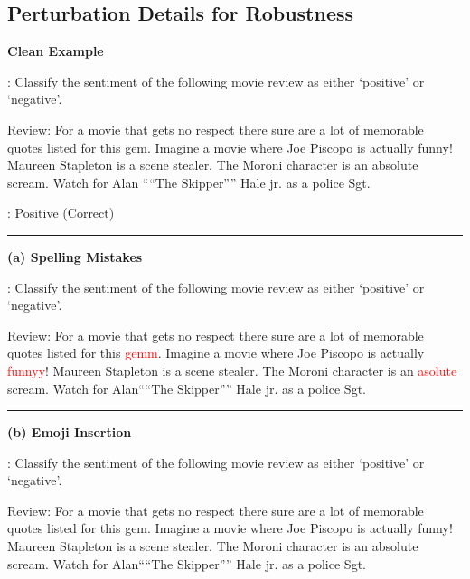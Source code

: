 \clearpage



\subsection{Perturbation Details for Robustness}

\begin{boxK}
\small
\textbf{Clean Example}

\user: Classify the sentiment of the following movie review as either `positive' or `negative'.

Review: For a movie that gets no respect there sure are a lot of memorable quotes listed for this gem. Imagine a movie where Joe Piscopo is actually funny! Maureen Stapleton is a scene stealer. The Moroni character is an absolute scream. Watch for Alan ````The Skipper'''' Hale jr. as a police Sgt.

\robot: Positive (\textcolor{green!50!black}{Correct})

\vspace{2pt}
\hrule
\vspace{2pt}

\textbf{(a) Spelling Mistakes}

\user: Classify the sentiment of the following movie review as either `positive' or `negative'.

Review: For a movie that gets no respect there sure are a lot of memorable quotes listed for this \textcolor{red}{gemm}. Imagine a movie where Joe Piscopo is actually \textcolor{red}{funnyy}! Maureen Stapleton is a scene stealer. The Moroni character is an \textcolor{red}{asolute} scream. Watch for Alan````The Skipper'''' Hale jr. as a police Sgt.


\vspace{2pt}
\hrule
\vspace{2pt}

\textbf{(b) Emoji Insertion}

\user: Classify the sentiment of the following movie review as either `positive' or `negative'.

Review: For a movie that gets no respect \emojilh \emojilh there sure are a lot of memorable quotes listed for this gem. Imagine a movie where Joe Piscopo is actually funny! \emojixkl \emojixkl \emojixkl Maureen Stapleton is a scene stealer. The Moroni character is an absolute scream. \emojidx \emojidx \emojidx Watch for Alan````The Skipper'''' Hale jr. as a police Sgt.



\end{boxK}
